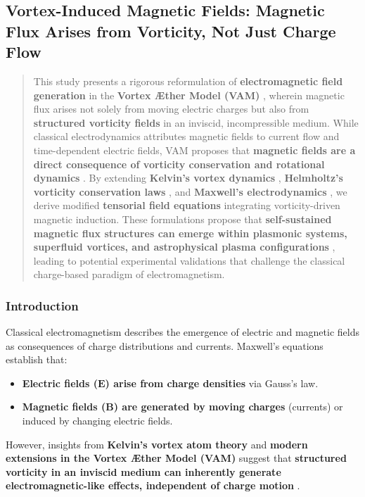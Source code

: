 

\subsection{Vortex-Induced Magnetic Fields: Magnetic Flux Arises from Vorticity, Not Just Charge Flow}\label{subsec:vortex-induced-magnetic-fields:-magnetic-flux-arises-from-vorticity-not-just-charge-flow}

\begin{abstract}
    This study presents a rigorous reformulation of \textbf{electromagnetic field generation}  in the \textbf{Vortex Æther Model (VAM)} , wherein magnetic flux arises not solely from moving electric charges but also from \textbf{structured vorticity fields}  in an inviscid, incompressible medium. While classical electrodynamics attributes magnetic fields to current flow and time-dependent electric fields, VAM proposes that \textbf{magnetic fields are a direct consequence of vorticity conservation and rotational dynamics} . By extending \textbf{Kelvin's vortex dynamics} , \textbf{Helmholtz's vorticity conservation laws} , and \textbf{Maxwell's electrodynamics} , we derive modified \textbf{tensorial field equations}  integrating vorticity-driven magnetic induction. These formulations propose that \textbf{self-sustained magnetic flux structures can emerge within plasmonic systems, superfluid vortices, and astrophysical plasma configurations} , leading to potential experimental validations that challenge the classical charge-based paradigm of electromagnetism.
\end{abstract}

\subsubsection*{Introduction}
Classical electromagnetism describes the emergence of electric and magnetic fields as consequences of charge distributions and currents. Maxwell's equations establish that:
\begin{itemize}
    \item \textbf{Electric fields (\(\mathbf{E}\)) arise from charge densities}  via Gauss's law.
    \item \textbf{Magnetic fields (\(\mathbf{B}\)) are generated by moving charges}  (currents) or induced by changing electric fields.
\end{itemize}
However, insights from \textbf{Kelvin's vortex atom theory}  and \textbf{modern extensions in the Vortex Æther Model (VAM)}  suggest that \textbf{structured vorticity in an inviscid medium can inherently generate electromagnetic-like effects, independent of charge motion} .

